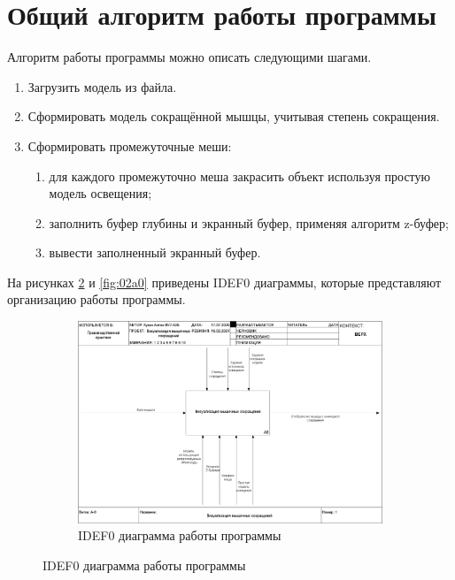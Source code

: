 \section{Общий алгоритм работы программы}
\label{sec:general}
Алгоритм работы программы можно описать следующими шагами.
\begin{enumerate}[1.]
	\item Загрузить модель из файла.
	\item Сформировать модель сокращённой мышцы, учитывая степень сокращения.
	\item Сформировать промежуточные меши:
	\begin{enumerate}
		\item для каждого промежуточно меша закрасить объект используя простую модель освещения;
		\item заполнить буфер глубины и экранный буфер, применяя алгоритм z-буфер;
		\item вывести заполненный экранный буфер.
	\end{enumerate}
\end{enumerate}
На рисунках \ref{fig:01a-0} и \ref{fig:02a0} приведены IDEF0 диаграммы, которые представляют организацию работы программы.
\begin{figure}
	\begin{figure}[H]
		\centering
		\includegraphics[height=0.5\paperheight]{images/01_A-0}
		\caption[IDEF0 диаграмма, блок А0]{IDEF0 диаграмма работы программы}
		\label{fig:01a-0}
	\end{figure}
\end{figure}

